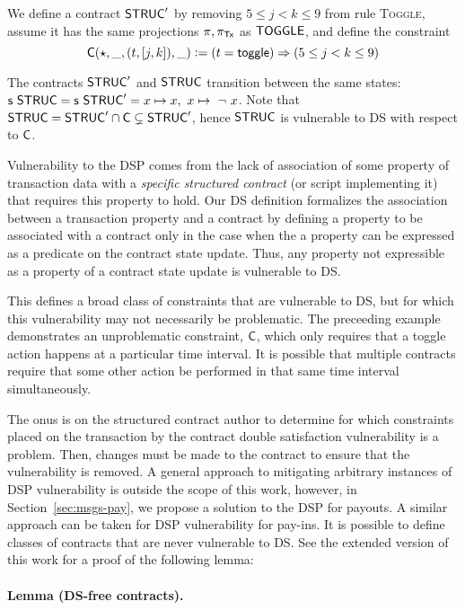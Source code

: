 We define a contract $\mathsf{STRUC}'$ by removing $5 \leq j < k \leq 9$ from rule \textsc{Toggle},
assume it has the same projections $\pi, \pi_{\mathsf{Tx}}$ as $\mathsf{TOGGLE}$,
and define the constraint
\[ \mathsf{C} (\star, \_, (t, [j,k]), \_) \mathrel{\mathop:}= (t = \mathsf{toggle}) \Rightarrow (5 \leq j < k \leq 9) \]

The contracts $\mathsf{STRUC}'$ and $\mathsf{STRUC}$ transition between the same states:
$\mathsf{s}~\mathsf{STRUC} = \mathsf{s}~\mathsf{STRUC}' = {x \mapsto x,\ x \mapsto ~\neg~x}$.
Note that $\mathsf{STRUC} = \mathsf{STRUC}' \cap \mathsf{C} \subsetneq \mathsf{STRUC}'$, hence
$\mathsf{STRUC}$ is vulnerable to DS with respect to $\mathsf{C}$.

Vulnerability to the DSP comes from the lack of association of some property of
transaction data with a \emph{specific structured
contract} (or script implementing it) that requires this property to hold.
Our DS definition formalizes the association between a transaction property and a
contract by defining a property to be associated with a contract only in the case
when the a property can be expressed as a predicate on the contract state update. Thus,
any property not expressible as a property of a contract state update is vulnerable
to DS.

This defines a broad class of constraints
that are vulnerable to DS, but for which this vulnerability may not necessarily be problematic.
The preceeding example demonstrates an unproblematic constraint, $\mathsf{C}$, which only requires
that a toggle action happens at a particular time interval. It is possible that multiple
contracts require that some other action be performed in that same time interval
simultaneously.

The onus is on the structured contract author to determine for which constraints placed on the
transaction by the contract double satisfaction vulnerability is a problem.
Then, changes must be made to the contract to ensure that the vulnerability is
removed. A general approach to mitigating arbitrary instances of DSP vulnerability
is outside the scope of this work, however,
in Section~\ref{sec:msgs-pay}, we propose a solution to the DSP for payouts.
A similar approach can be taken for DSP vulnerability for pay-ins.
It is possible to define classes of contracts that are never vulnerable to DS.
See the extended version of this work for a proof of the following lemma:

\paragraph{Lemma (DS-free contracts). }

